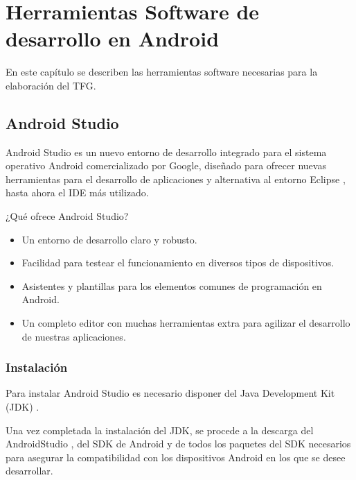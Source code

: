 %
%
%
%

\cleardoublepage
\chapter{Herramientas Software de desarrollo en Android} \label{chap:polytopes}  

En este capítulo se describen las herramientas software necesarias para la elaboración del TFG.

\section{Android Studio}

Android Studio \cite{URL::AndroidStudio} es un nuevo entorno de desarrollo integrado para el sistema operativo Android comercializado por Google, 
diseñado para ofrecer nuevas herramientas para el desarrollo de aplicaciones y alternativa al entorno Eclipse \cite{URL::Eclipse}, 
hasta ahora el IDE más utilizado.

¿Qué ofrece Android Studio? 
\begin{itemize}
\item Un entorno de desarrollo claro y robusto.
\item Facilidad para testear el funcionamiento en diversos tipos de dispositivos.
\item Asistentes y plantillas para los elementos comunes de programación en Android.
\item Un completo editor con muchas herramientas extra para agilizar el desarrollo de nuestras aplicaciones.
\end{itemize}

\subsection{Instalación}
Para instalar Android Studio es necesario disponer del Java Development Kit (JDK) \cite{URL::JDKInfo}. 

Una vez completada la instalación del JDK, se procede a la descarga del AndroidStudio \cite{URL::AndroidStudio}, del SDK de Android
\cite{URL::InstallSDK} y de todos los paquetes del SDK \cite{URL::SDKPackages} necesarios para asegurar la compatibilidad con los dispositivos Android en
los que se desee desarrollar.

